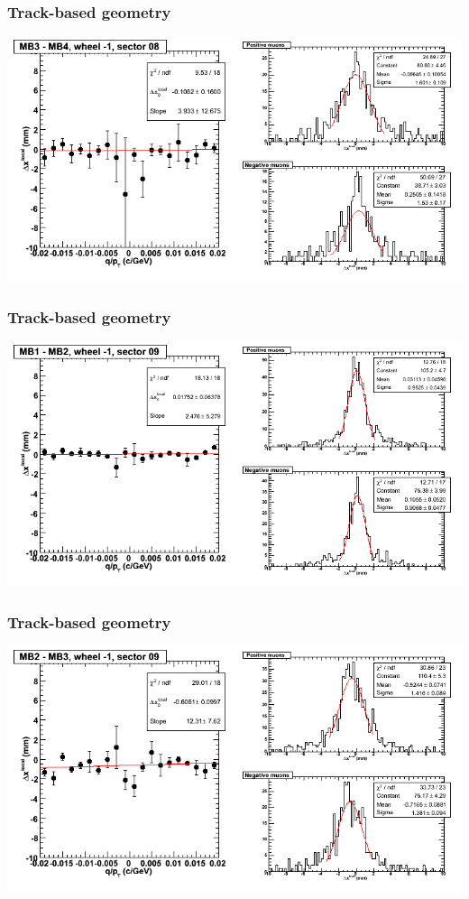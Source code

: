 \documentclass[compress]{beamer}
\begin{document}
\begin{frame}
\frametitle{Track-based geometry}
\includegraphics[width=\linewidth]{NOV4_segdiffs/dt13_resid_B_08_34.png}
\end{frame}

\begin{frame}
\frametitle{Track-based geometry}
\includegraphics[width=\linewidth]{NOV4_segdiffs/dt13_resid_B_09_12.png}
\end{frame}

\begin{frame}
\frametitle{Track-based geometry}
\includegraphics[width=\linewidth]{NOV4_segdiffs/dt13_resid_B_09_23.png}
\end{frame}
\end{document}
